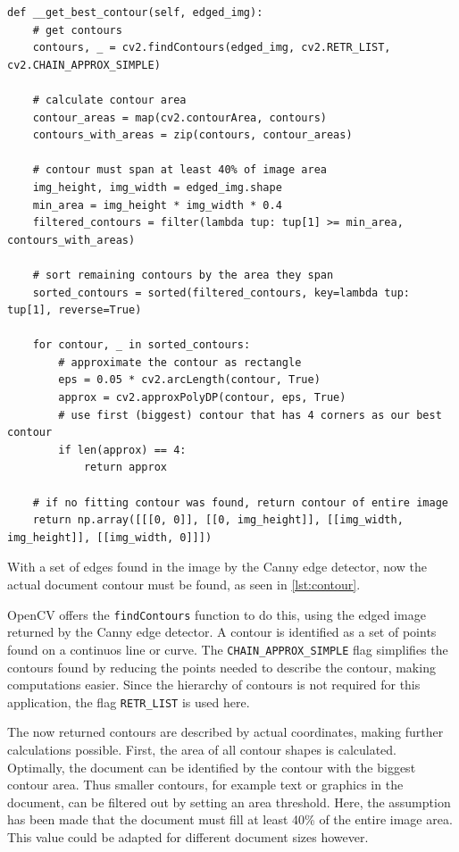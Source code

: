 \begin{lstlisting}[caption={Contour detection method}, label={lst:contour}, float]
def __get_best_contour(self, edged_img):
    # get contours
    contours, _ = cv2.findContours(edged_img, cv2.RETR_LIST, cv2.CHAIN_APPROX_SIMPLE)

    # calculate contour area
    contour_areas = map(cv2.contourArea, contours)
    contours_with_areas = zip(contours, contour_areas)

    # contour must span at least 40% of image area
    img_height, img_width = edged_img.shape
    min_area = img_height * img_width * 0.4
    filtered_contours = filter(lambda tup: tup[1] >= min_area, contours_with_areas)

    # sort remaining contours by the area they span
    sorted_contours = sorted(filtered_contours, key=lambda tup: tup[1], reverse=True)

    for contour, _ in sorted_contours:
        # approximate the contour as rectangle
        eps = 0.05 * cv2.arcLength(contour, True)
        approx = cv2.approxPolyDP(contour, eps, True)
        # use first (biggest) contour that has 4 corners as our best contour
        if len(approx) == 4:
            return approx

    # if no fitting contour was found, return contour of entire image
    return np.array([[[0, 0]], [[0, img_height]], [[img_width, img_height]], [[img_width, 0]]])
\end{lstlisting}

With a set of edges found in the image by the Canny edge detector, now the actual document contour must be found, as seen in \autoref{lst:contour}.

OpenCV offers the \texttt{findContours} function to do this, using the edged image returned by the Canny edge detector. A contour is identified as a set of points found on a continuos line or curve. The \texttt{CHAIN\_APPROX\_SIMPLE} flag simplifies the contours found by reducing the points needed to describe the contour, making computations easier. Since the hierarchy of contours is not required for this application, the flag \texttt{RETR\_LIST} is used here.

The now returned contours are described by actual coordinates, making further calculations possible. First, the area of all contour shapes is calculated. Optimally, the document can be identified by the contour with the biggest contour area. Thus smaller contours, for example text or graphics in the document, can be filtered out by setting an area threshold. Here, the assumption has been made that the document must fill at least 40\% of the entire image area. This value could be adapted for different document sizes however.

